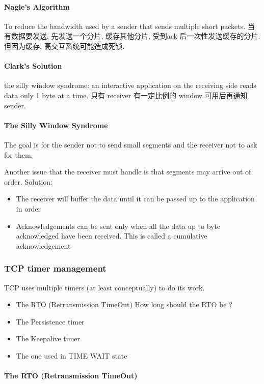 \paragraph{Nagle's Algorithm}To reduce the bandwidth used by a sender that sends multiple short packets. 当有数据要发送, 先发送一个分片, 缓存其他分片, 受到ack 后一次性发送缓存的分片. 但因为缓存, 高交互系统可能造成死锁. 

\paragraph{Clark's Solution} the silly window syndrome: an interactive application on the receiving side reads data only 1 byte at a time. 只有 receiver 有一定比例的 window 可用后再通知 sender. 

\paragraph{The Silly Window Syndrome}The goal is for the sender not to send small segments and the receiver not to ask for them. 


Another issue that the receiver must handle is that segments may arrive out of order. Solution:
\begin{itemize}\scriptsize
    \item The receiver will buffer the data until it can be passed up to the
    application in order
    \item Acknowledgements can be sent only when all the data up to byte
    acknowledged have been received. This is called a cumulative acknowledgement
\end{itemize}

\subsubsection{TCP timer management}
TCP uses multiple timers (at least conceptually) to do its
work.
\begin{itemize}
    \item The RTO (Retransmission TimeOut)
    \subitem How long should the RTO be ? 
    \item The Persistence timer
    \item The Keepalive timer
    \item The one used in TIME WAIT state
\end{itemize}

\paragraph{The RTO (Retransmission TimeOut)}\quad 

